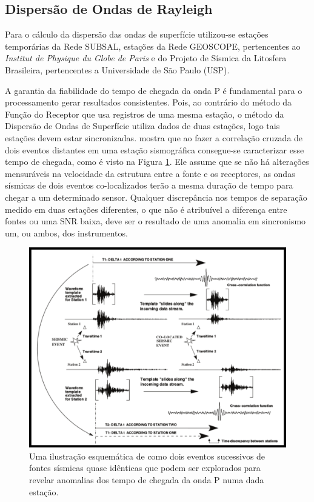 \subsection{Dispersão de Ondas de Rayleigh}

Para o cálculo da dispersão das ondas de superfície utilizou-se estações temporárias da Rede SUBSAL, estações da Rede GEOSCOPE, pertencentes ao \textit{Institut de Physique du Globe de Paris} e do Projeto de Sísmica  da Litosfera Brasileira, pertencentes a Universidade de São Paulo (USP).

A garantia da fiabilidade do tempo de chegada da onda P é fundamental para o processamento gerar resultados consistentes. Pois, ao contrário do método da Função do Receptor que usa registros de uma mesma estação, o método da Dispersão de Ondas de Superfície utiliza dados de duas estações, logo tais estações devem estar sincronizadas. \cite{gibbons_identification_2006} mostra que ao fazer a correlação cruzada de dois eventos distantes em uma estação sismográfica consegue-se caracterizar esse tempo de chegada, como é visto na Figura \ref{teste_tempo}. Ele assume que se não há alterações mensuráveis na velocidade da estrutura entre a fonte e os receptores, as ondas sísmicas de dois eventos co-localizados terão a mesma duração de tempo para chegar a um determinado sensor. Qualquer discrepância nos tempos de separação medido em duas estações diferentes, o que não é atribuível a diferença entre fontes ou uma SNR baixa, deve ser o resultado de uma anomalia em sincronismo um, ou ambos, dos instrumentos.

\begin{figure}[!ht]
\centering
\includegraphics[scale=0.6]{Figs/correlacao_tempo_de_chegada.png}
\caption[Uma ilustração esquemática mostrando a correlação dos tempos de chegada da onda P.]{Uma ilustração esquemática de como dois eventos sucessivos de fontes sísmicas quase idênticas que podem ser explorados para revelar anomalias dos tempo de chegada da onda P numa dada estação. \cite{gibbons_identification_2006}}
\label{teste_tempo}
\end{figure}

